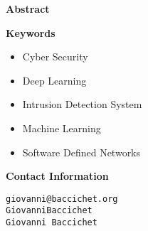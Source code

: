 \thispagestyle{empty}

{\bf\Huge Abstract}

\vspace{1cm}

\lipsum[1-3]

\vspace{1cm}

{\bf\Huge Keywords}

\vspace{1cm}

\begin{itemize}
    \item Cyber Security
    \item Deep Learning
    \item Intrusion Detection System
    \item Machine Learning
    \item Software Defined Networks
\end{itemize}

\vspace{1cm}

{\bf\Huge Contact Information}

\vspace{1cm}

\faEnvelopeO \quad \texttt{giovanni@baccichet.org} \\

\faGithub \quad \texttt{GiovanniBaccichet} \\

\faLinkedin \quad \texttt{Giovanni Baccichet}